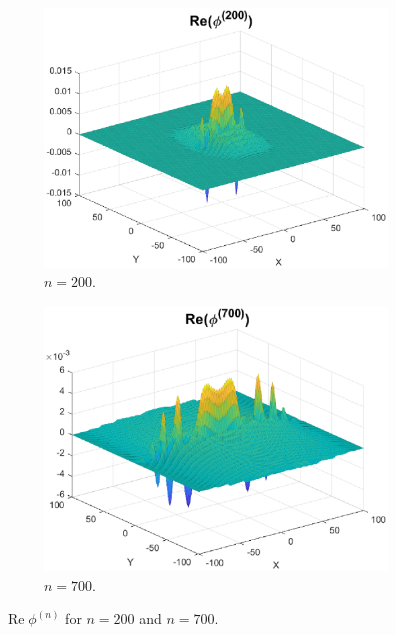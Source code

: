 \documentclass[11pt]{article}
\newenvironment{example}
  {\pushQED{\qed}\renewcommand{\qedsymbol}{$\triangle$}\examplex}
  {\popQED\endexamplex}
\theoremstyle{remark}
\renewcommand\Re{\operatorname{Re}}%
\begin{document}
\begin{example}
\begin{figure}[!htb]
    \begin{subfigure}{0.49\textwidth}
    \centering
    \includegraphics[scale=0.58]{Fig10a.eps}
    \caption{$n = 200$.}
    \label{fig:Conv_Pwr_5a}
    \end{subfigure}
    \begin{subfigure}{0.49\textwidth}
    \centering
    \includegraphics[scale=0.58]{Fig10b.eps}
    \caption{$n = 700$.}
    \label{fig:Conv_Pwr_5b}
    \end{subfigure}
    \caption{$\Re{\phi^{(n)}}$ for $n = 200$ and $n=700$.}
    \label{fig:Conv_Pwr_50}
\end{figure}



\end{example}
\end{document}
